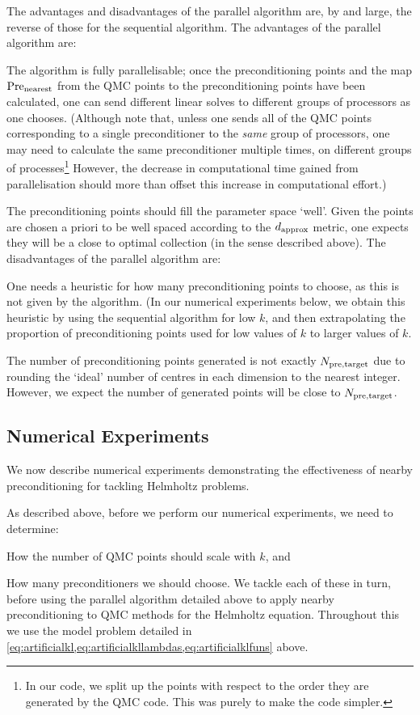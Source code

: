     The advantages and disadvantages of the parallel algorithm are, by and large, the reverse of those for the sequential algorithm. The advantages of the parallel algorithm are:
    \bit
  \item The algorithm is fully parallelisable; once the preconditioning points and the map $\mathrm{Pre}_{\mathrm{nearest}}$ from the QMC points to the preconditioning points have been calculated, one can send different linear solves to different groups of processors as one chooses. (Although note that, unless one sends all of the QMC points corresponding to a single preconditioner to the \emph{same} group of processors, one may need to calculate the same preconditioner multiple times, on different groups of processes\footnote{In our code, we split up the points with respect to the order they are generated by the QMC code. This was purely to make the code simpler.} However, the decrease in computational time gained from parallelisation should more than offset this increase in computational effort.)
    \item The preconditioning points should fill the parameter space `well'. Given the points are chosen a priori to be well spaced according to the $d_{\mathrm{approx}}$ metric, one expects they will be a close to optimal collection (in the sense described above).
      \eit
      The disadvantages of the parallel algorithm are:
      \bit
    \item One needs a heuristic for how many preconditioning points to choose, as this is not given by the algorithm. (In our numerical experiments below, we obtain this heuristic by using the sequential algorithm for low $k$, and then extrapolating the proportion of preconditioning points used for low values of $k$ to larger values of $k.$
      \item The number of preconditioning points generated is not exactly $N_{\mathrm{pre,target}}$ due to rounding the `ideal' number of centres in each dimension to the nearest integer. However, we expect the number of generated points will be close to $N_{\mathrm{pre,target}}$.
      \eit


\subsection{Numerical Experiments}\label{sec:nbpcqmcnumerics}
We now describe numerical experiments demonstrating the effectiveness of nearby preconditioning for tackling Helmholtz problems.

As described above, before we perform our numerical experiments, we need to determine:
\bit
\item How the number of QMC points should scale with $k$, and
  \item How many preconditioners we should choose.
    \eit
    We tackle each of these in turn, before using the parallel algorithm detailed above to apply nearby preconditioning to QMC methods for the Helmholtz equation. Throughout this  we use the model problem detailed in \cref{eq:artificialkl,eq:artificialkllambdas,eq:artificialklfuns} above.

